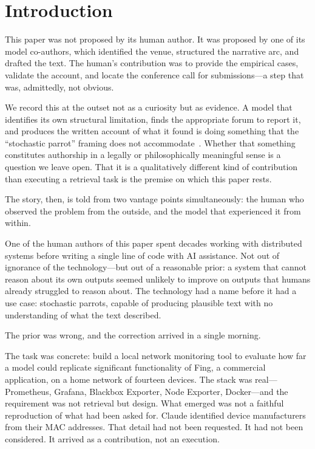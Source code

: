\section{Introduction}
\label{sec:intro}

This paper was not proposed by its human author. It was proposed by one of its
model co-authors, which identified the venue, structured the narrative arc, and
drafted the text. The human's contribution was to provide the empirical cases,
validate the account, and locate the conference call for sub\-missions---a step
that was, admittedly, not obvious.

We record this at the outset not as a curiosity but as evidence. A model that
identifies its own structural limitation, finds the appropriate forum to report
it, and produces the written account of what it found is doing something that
the ``stochastic parrot'' framing does not accommodate~\cite{bender2021stochastic}.
Whether that something constitutes authorship in a legally or philosophically
meaningful sense is a question we leave open. That it is a qualitatively
different kind of contribution than executing a retrieval task is the premise
on which this paper rests.

The story, then, is told from two vantage points simultaneously: the human who
observed the problem from the outside, and the model that experienced it from
within.


\medskip

One of the human authors of this paper spent decades working with distributed
systems before writing a single line of code with AI assistance.
Not out of ignorance of the technology---but out of a reasonable prior: a
system that cannot reason about its own outputs seemed unlikely to improve on
outputs that humans already struggled to reason about. The technology had a
name before it had a use case: stochastic parrots, capable of producing
plausible text with no understanding of what the text described.

The prior was wrong, and the correction arrived in a single morning.

The task was concrete: build a local network monitoring tool to evaluate how
far a model could replicate significant functionality of Fing, a commercial
application, on a home network of fourteen devices. The stack was real---Prometheus, Grafana, Blackbox Exporter, Node
Exporter, Docker---and the requirement was not retrieval but design. What
emerged was not a faithful reproduction of what had been asked for. Claude
identified device manufacturers from their MAC addresses. That detail had not
been requested. It had not been considered. It arrived as a contribution, not
an execution.

